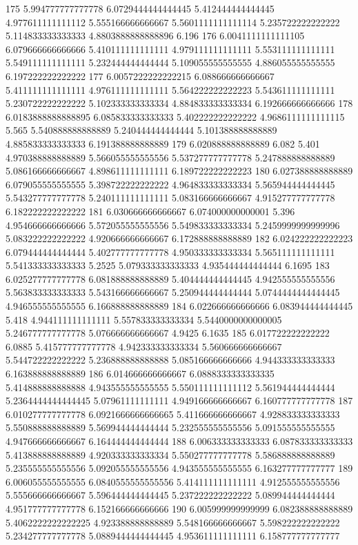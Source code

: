 175 5.994777777777778 6.0729444444444445 5.412444444444445 4.977611111111112 5.555166666666667 5.5601111111111114 5.235722222222222 5.114833333333333 4.8803888888888896 6.196
176 6.0041111111111105 6.079666666666666 5.410111111111111 4.979111111111111 5.553111111111111 5.549111111111111 5.232444444444444 5.109055555555555 4.886055555555555 6.197222222222222
177 6.0057222222222215 6.088666666666667 5.411111111111111 4.976111111111111 5.564222222222223 5.543611111111111 5.230722222222222 5.102333333333334 4.884833333333334 6.192666666666666
178 6.0183888888888895 6.085833333333333 5.402222222222222 4.9686111111111115 5.565 5.540888888888889 5.240444444444444 5.101388888888889 4.885833333333333 6.191388888888889
179 6.020888888888889 6.082 5.401 4.970388888888889 5.566055555555556 5.537277777777778 5.247888888888889 5.086166666666667 4.898611111111111 6.189722222222223
180 6.027388888888889 6.079055555555555 5.398722222222222 4.964833333333334 5.565944444444445 5.543277777777778 5.240111111111111 5.083166666666667 4.915277777777778 6.182222222222222
181 6.030666666666667 6.074000000000001 5.396 4.954666666666666 5.572055555555556 5.549833333333334 5.2459999999999996 5.083222222222222 4.920666666666667 6.172888888888889
182 6.024222222222223 6.079444444444444 5.402777777777778 4.950333333333334 5.565111111111111 5.541333333333333 5.2525 5.079333333333333 4.935444444444444 6.1695
183 6.025277777777778 6.081888888888889 5.404444444444445 4.942555555555556 5.563833333333333 5.543166666666667 5.250944444444444 5.0744444444444445 4.946555555555555 6.166888888888889
184 6.022666666666666 6.083944444444445 5.418 4.944111111111111 5.557833333333334 5.5440000000000005 5.246777777777778 5.076666666666667 4.9425 6.1635
185 6.017722222222222 6.0885 5.415777777777778 4.942333333333334 5.560666666666667 5.544722222222222 5.236888888888888 5.085166666666666 4.944333333333333 6.163888888888889
186 6.014666666666667 6.0888333333333335 5.414888888888888 4.943555555555555 5.550111111111112 5.561944444444444 5.2364444444444445 5.07961111111111 4.949166666666667 6.160777777777778
187 6.010277777777778 6.0921666666666665 5.411666666666667 4.928833333333333 5.550888888888889 5.569944444444444 5.232555555555556 5.091555555555555 4.947666666666667 6.164444444444444
188 6.006333333333333 6.087833333333333 5.413888888888889 4.920333333333334 5.550277777777778 5.586888888888889 5.235555555555556 5.092055555555556 4.943555555555555 6.163277777777777
189 6.006055555555555 6.0840555555555556 5.414111111111111 4.912555555555556 5.555666666666667 5.596444444444445 5.237222222222222 5.089944444444444 4.951777777777778 6.152166666666666
190 6.005999999999999 6.082388888888889 5.4062222222222225 4.923388888888889 5.548166666666667 5.598222222222222 5.234277777777778 5.0889444444444445 4.953611111111111 6.158777777777777
